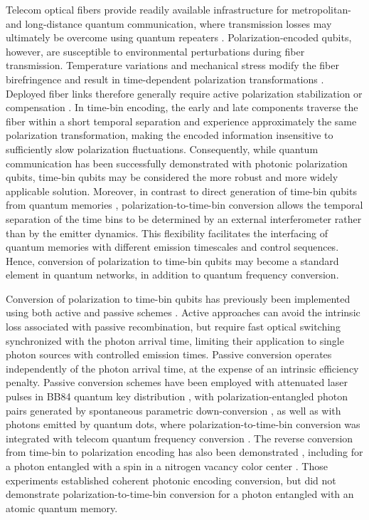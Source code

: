 \documentclass[reprint, superscriptaddress, longbibliography, floatfix, twocolumn, nofootinbib, amsmath, amssymb, aps, showkeys]{revtex4-2}
\begin{document}
Telecom optical fibers provide readily available infrastructure for metropolitan- and long-distance quantum communication, where transmission losses may ultimately be overcome using quantum repeaters \cite{Briegel_1998}. Polarization-encoded qubits, however, are susceptible to environmental perturbations during fiber transmission. Temperature variations and mechanical stress modify the fiber birefringence and result in time-dependent polarization transformations \cite{Ulrich_1979, Ding_2017, Kucera_2024}. Deployed fiber links therefore generally require active polarization stabilization or compensation \cite{Kucera_2024}. In time-bin encoding, the early and late components traverse the fiber within a short temporal separation and experience approximately the same polarization transformation, making the encoded information insensitive to sufficiently slow polarization fluctuations. Consequently, while quantum communication has been successfully demonstrated with photonic polarization qubits, time-bin qubits may be considered the more robust and more widely applicable solution. Moreover, in contrast to direct generation of time-bin qubits from quantum memories \cite{Ward_2022, Saha_2025}, polarization-to-time-bin conversion allows the temporal separation of the time bins to be determined by an external interferometer rather than by the emitter dynamics. This flexibility facilitates the interfacing of quantum memories with different emission timescales and control sequences. Hence, conversion of polarization to time-bin qubits may become a standard element in quantum networks, in addition to quantum frequency conversion. 

Conversion of polarization to time-bin qubits has previously been implemented using both active \cite{Kupchak_2017} and passive schemes \cite{Sanaka_2002}. Active approaches can avoid the intrinsic loss associated with passive recombination, but require fast optical switching synchronized with the photon arrival time, limiting their application to single photon sources with controlled emission times. Passive conversion operates independently of the photon arrival time, at the expense of an intrinsic efficiency penalty. Passive conversion schemes have been employed with attenuated laser pulses in BB84 quantum key distribution \cite{Scalcon_2022}, with polarization-entangled photon pairs generated by spontaneous parametric down-conversion \cite{Martin_2013}, as well as with photons emitted by quantum dots, where polarization-to-time-bin conversion was integrated with telecom quantum frequency conversion \cite{Yu_2015}. The reverse conversion from time-bin to polarization encoding has also been demonstrated \cite{Sanaka_2002, Takesue_05, Bussieres_2010}, including for a photon entangled with a spin in a nitrogen vacancy color center \cite{Vasconcelos_2020}. Those experiments established coherent photonic encoding conversion, but did not demonstrate polarization-to-time-bin conversion for a photon entangled with an atomic quantum memory.
\end{document}

